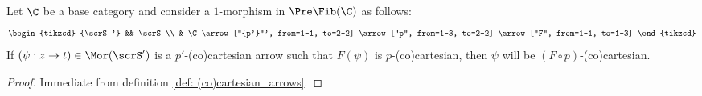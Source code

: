             \begin{proposition} \label{prop: (co)cartesian_arrows_under_1_morphisms_of_prefibrations}
                Let $\C$ be a base category and consider a $1$-morphism in $\Pre\Fib(\C)$ as follows:
                    $$
                        \begin{tikzcd}
                        	{\scrS'} && \scrS \\
                        	& \C
                        	\arrow["{p'}"', from=1-1, to=2-2]
                        	\arrow["p", from=1-3, to=2-2]
                        	\arrow["F", from=1-1, to=1-3]
                        \end{tikzcd}
                    $$
                If $(\psi: z \to t) \in \Mor(\scrS')$ is a $p'$-(co)cartesian arrow such that $F(\psi)$ is $p$-(co)cartesian, then $\psi$ will be $(F \circ p)$-(co)cartesian. 
            \end{proposition}
                \begin{proof}
                    Immediate from definition \ref{def: (co)cartesian_arrows}.
                \end{proof}
            
